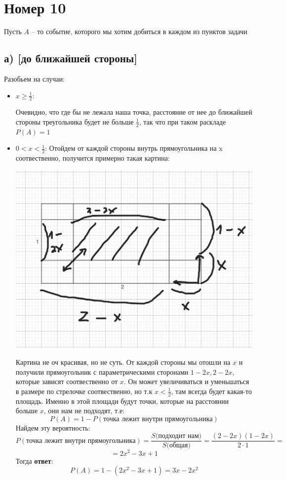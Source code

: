 \documentclass[a4paper,12pt]{article}
\begin{document}
\section*{Номер 10}
Пусть $A$ -- то событие, которого мы хотим добиться в каждом из пунктов задачи
\subsection*{а) [до ближайшей стороны]}
Разобьем на случаи:
\begin{itemize}
\item $x \geq \frac12$:

Очевидно, что где бы не лежала наша точка, расстояние от нее до ближайшей стороны  треугольника будет не больше $\frac{1}{2}$, так что при таком раскладе $P(A)= 1$
\item $0 < x < \frac12$:
Отойдем от каждой стороны внутрь прямоугольника на x соотвественно, получится примерно такая картина:
\begin{center}
\includegraphics[scale=0.3]{3.png}
\end{center}
Картина не оч красивая, но не суть.  От каждой стороны мы отошли на $x$ и получили прямоугольник с параметрическими сторонами $1 - 2x, 2-2x$, которые зависят соотвественно от $x$. Он может увеличиваться и уменьшаться в размере по стрелочке соотвественно, но т.к $x < \frac12$, там всегда будет какая-то площадь. Именно в этой площади будут точки, которые на расстоянии больше $x$, они нам не подходят, т.е:
\[
P(A) = 1 - P(\text{точка лежит внутри прямоугольника})
\]
Найдем эту вероятность:
\[
P(\text{точка лежит внутри прямоугольника}) = \frac{S\text{(подходит нам)}}{S(\text{общая)}} = \frac{(2-2x)(1-2x)}{2 \cdot 1} =
\]
\[
 = 2x^2 - 3x + 1
\]
Тогда \textbf{ответ}:
\[
P(A) = 1 - (2x^2 - 3x +1 ) = 3x - 2x^2
\]
\end{itemize}
\end{document}
